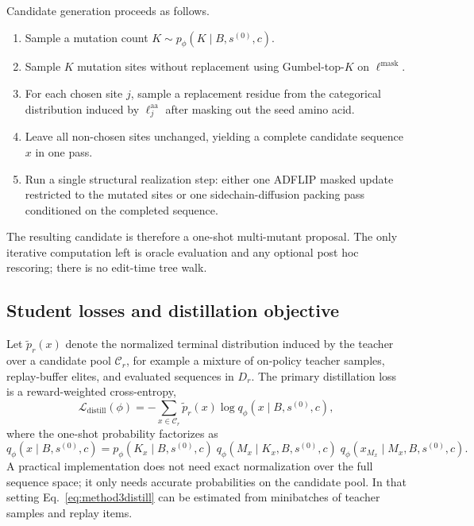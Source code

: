 \documentclass[11pt]{article}
\begin{document}
	Candidate generation proceeds as follows.
	\begin{enumerate}[leftmargin=1.5em]
		\item Sample a mutation count $K\sim p_{\phi}(K\mid B,s^{(0)},c)$.
		\item Sample $K$ mutation sites without replacement using Gumbel-top-$K$ on $\ell^{\mathrm{mask}}$.
		\item For each chosen site $j$, sample a replacement residue from the categorical distribution induced by $\ell^{\mathrm{aa}}_j$ after masking out the seed amino acid.
		\item Leave all non-chosen sites unchanged, yielding a complete candidate sequence $x$ in one pass.
		\item Run a single structural realization step: either one ADFLIP masked update restricted to the mutated sites or one sidechain-diffusion packing pass conditioned on the completed sequence.
	\end{enumerate}
	The resulting candidate is therefore a one-shot multi-mutant proposal. The only iterative computation left is oracle evaluation and any optional post hoc rescoring; there is no edit-time tree walk.
	
	\subsection{Student losses and distillation objective}
	
	Let $\widetilde p_r(x)$ denote the normalized terminal distribution induced by the teacher over a candidate pool $\mathcal{C}_r$, for example a mixture of on-policy teacher samples, replay-buffer elites, and evaluated sequences in $D_r$. The primary distillation loss is a reward-weighted cross-entropy,
	\begin{equation}
		\label{eq:method3distill}
		\mathcal{L}_{\mathrm{distill}}(\phi)=-\sum_{x\in\mathcal{C}_r} \widetilde p_r(x)\log q_{\phi}(x\mid B,s^{(0)},c),
	\end{equation}
	where the one-shot probability factorizes as
	\begin{equation}
		q_{\phi}(x\mid B,s^{(0)},c)=p_{\phi}(K_x\mid B,s^{(0)},c)\;q_{\phi}(M_x\mid K_x,B,s^{(0)},c)\;q_{\phi}(x_{M_x}\mid M_x,B,s^{(0)},c).
	\end{equation}
	A practical implementation does not need exact normalization over the full sequence space; it only needs accurate probabilities on the candidate pool. In that setting Eq.~\eqref{eq:method3distill} can be estimated from minibatches of teacher samples and replay items.
	
\end{document}
